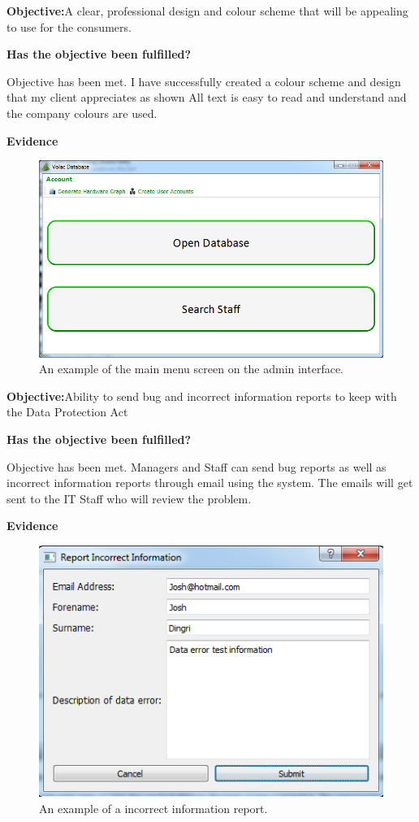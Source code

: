 \textbf{Objective:}A clear, professional design and colour scheme that will be appealing to use for the consumers.

\textbf{Has the objective been fulfilled?}

Objective has been met. I have successfully created a colour scheme and design that my client appreciates as shown  All text is easy to read and understand and the company colours are used.

\textbf{Evidence}

\begin{figure}[H]
    \includegraphics[width=\textwidth]{./Manual/Images/graph.png}
    \caption{An example of the main menu screen on the admin interface.} 
\end{figure}

\textbf{Objective:}Ability to send bug and incorrect information reports to keep with the Data Protection Act

\textbf{Has the objective been fulfilled?}

Objective has been met. Managers and Staff can send bug reports as well as incorrect information reports through email using the system. The emails will get sent to the IT Staff who will review the problem. 

\textbf{Evidence}

\begin{figure}[H]
    \includegraphics[width=\textwidth]{./Testing/Images/SubmitErrorReport.png}
    \caption{An example of a incorrect information report.} 
\end{figure}

